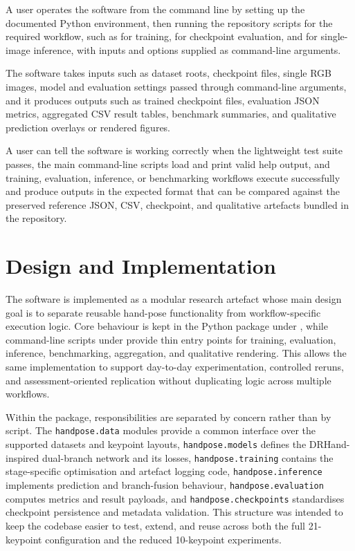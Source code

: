 ﻿\documentclass[11pt,a4paper]{article}
\begin{document}
A user operates the software from the command line by setting up the documented Python environment, then running the repository scripts for the required workflow, such as  for training,  for checkpoint evaluation, and  for single-image inference, with inputs and options supplied as command-line arguments.

\medskip

The software takes inputs such as dataset roots, checkpoint files, single RGB images, model and evaluation settings passed through command-line arguments, and it produces outputs such as trained checkpoint files, evaluation JSON metrics, aggregated CSV result tables, benchmark summaries, and qualitative prediction overlays or rendered figures.

\medskip

A user can tell the software is working correctly when the lightweight test suite passes, the main command-line scripts load and print valid help output, and training, evaluation, inference, or benchmarking workflows execute successfully and produce outputs in the expected format that can be compared against the preserved reference JSON, CSV, checkpoint, and qualitative artefacts bundled in the repository.

\section{Design and Implementation}

The software is implemented as a modular research artefact whose main design goal is to separate reusable hand-pose functionality from workflow-specific execution logic. Core behaviour is kept in the Python package under , while command-line scripts under  provide thin entry points for training, evaluation, inference, benchmarking, aggregation, and qualitative rendering. This allows the same implementation to support day-to-day experimentation, controlled reruns, and assessment-oriented replication without duplicating logic across multiple workflows.

\medskip

Within the package, responsibilities are separated by concern rather than by script. The \texttt{handpose.data} modules provide a common interface over the supported datasets and keypoint layouts, \texttt{handpose.models} defines the DRHand-inspired dual-branch network and its losses, \texttt{handpose.training} contains the stage-specific optimisation and artefact logging code, \texttt{handpose.inference} implements prediction and branch-fusion behaviour, \texttt{handpose.evaluation} computes metrics and result payloads, and \texttt{handpose.checkpoints} standardises checkpoint persistence and metadata validation. This structure was intended to keep the codebase easier to test, extend, and reuse across both the full 21-keypoint configuration and the reduced 10-keypoint experiments.
\end{document}
